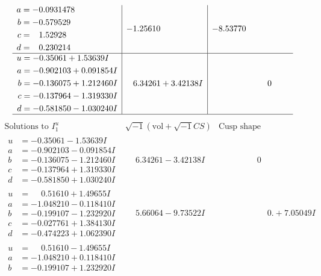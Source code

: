 \documentclass[1p]{elsarticle_modified}
\theoremstyle{definition}
\newcommand{\I}{\sqrt{-1}}
\begin{document}
$$\begin{array}{c|c|c}
\begin{aligned}
a &= -0.0931478\phantom{ +0.000000I} \\
b &= -0.579529\phantom{ +0.000000I} \\
c &= \phantom{-}1.52928\phantom{ +0.000000I} \\
d &= \phantom{-}0.230214\phantom{ +0.000000I}\end{aligned}
 & -1.25610\phantom{ +0.000000I} & -8.53770\phantom{ +0.000000I} \\ \hline\begin{aligned}
u &= -0.35061 + 1.53639 I \\
a &= -0.902103 + 0.091854 I \\
b &= -0.136075 + 1.212460 I \\
c &= -0.137964 - 1.319330 I \\
d &= -0.581850 - 1.030240 I\end{aligned}
 & \phantom{-}6.34261 + 3.42138 I & \phantom{-0.000000 } 0\\
 \hline 
 \end{array}$$\newpage$$\begin{array}{c|c|c}  
\text{Solutions to }I^u_{1}& \I (\text{vol} + \sqrt{-1}CS) & \text{Cusp shape}\\
 \hline 
\begin{aligned}
u &= -0.35061 - 1.53639 I \\
a &= -0.902103 - 0.091854 I \\
b &= -0.136075 - 1.212460 I \\
c &= -0.137964 + 1.319330 I \\
d &= -0.581850 + 1.030240 I\end{aligned}
 & \phantom{-}6.34261 - 3.42138 I & \phantom{-0.000000 } 0 \\ \hline\begin{aligned}
u &= \phantom{-}0.51610 + 1.49655 I \\
a &= -1.048210 - 0.118410 I \\
b &= -0.199107 - 1.232920 I \\
c &= -0.027761 + 1.384130 I \\
d &= -0.474223 + 1.062390 I\end{aligned}
 & \phantom{-}5.66064 - 9.73522 I & \phantom{-0.000000 -}0. + 7.05049 I \\ \hline\begin{aligned}
u &= \phantom{-}0.51610 - 1.49655 I \\
a &= -1.048210 + 0.118410 I \\
b &= -0.199107 + 1.232920 I \\

\end{aligned}
\end{array}$$
\end{document}
